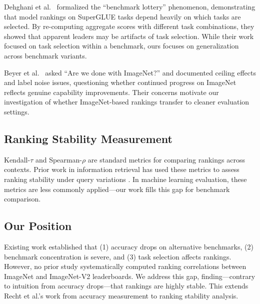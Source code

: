 Dehghani et al.~\cite{dehghani2021benchmark} formalized the ``benchmark lottery'' phenomenon, demonstrating that model rankings on SuperGLUE tasks depend heavily on which tasks are selected. By re-computing aggregate scores with different task combinations, they showed that apparent leaders may be artifacts of task selection. While their work focused on task selection within a benchmark, ours focuses on generalization across benchmark variants.

Beyer et al.~\cite{beyer2020we} asked ``Are we done with ImageNet?'' and documented ceiling effects and label noise issues, questioning whether continued progress on ImageNet reflects genuine capability improvements. Their concerns motivate our investigation of whether ImageNet-based rankings transfer to cleaner evaluation settings.

\subsection{Ranking Stability Measurement}

Kendall-$\tau$ and Spearman-$\rho$ are standard metrics for comparing rankings across contexts. Prior work in information retrieval has used these metrics to assess ranking stability under query variations \cite{voorhees2000variations}. In machine learning evaluation, these metrics are less commonly applied---our work fills this gap for benchmark comparison.

\subsection{Our Position}

Existing work established that (1) accuracy drops on alternative benchmarks, (2) benchmark concentration is severe, and (3) task selection affects rankings. However, no prior study systematically computed ranking correlations between ImageNet and ImageNet-V2 leaderboards. We address this gap, finding---contrary to intuition from accuracy drops---that rankings are highly stable. This extends Recht et al.'s work from accuracy measurement to ranking stability analysis.
